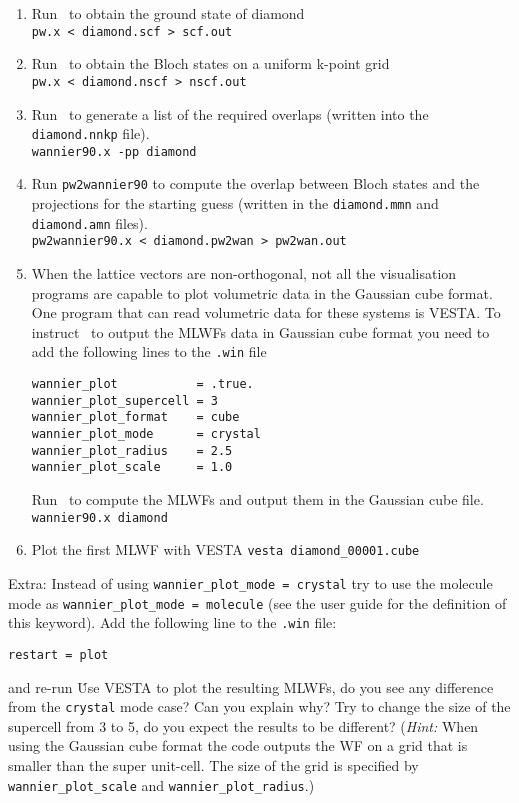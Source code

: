 \documentclass[a4paper,11pt,twoside]{article}
\begin{document}
\begin{enumerate}
\item Run \pwscf\ to obtain the ground state of diamond\\
{\tt pw.x < diamond.scf > scf.out}

\item Run \pwscf\ to obtain the Bloch states on a uniform k-point grid\\
{\tt pw.x < diamond.nscf > nscf.out}

\item Run \wannier\ to generate a list of the required overlaps (written
  into the {\tt diamond.nnkp} file).\\ 
{\tt wannier90.x -pp diamond}

\item Run {\tt pw2wannier90} to compute the overlap between Bloch
  states and the projections for the starting guess (written in the
  {\tt diamond.mmn} and {\tt diamond.amn} files).\\  
{\tt pw2wannier90.x < diamond.pw2wan > pw2wan.out}

\item When the lattice vectors are non-orthogonal, not all the visualisation programs are capable to plot volumetric data in the Gaussian cube format. 
One program that can read volumetric data for these systems is VESTA. 
To instruct \wannier\ to output the MLWFs data in Gaussian cube format you need to add the following lines to the {\tt .win} file
\begin{verbatim}
wannier_plot           = .true.
wannier_plot_supercell = 3
wannier_plot_format    = cube
wannier_plot_mode      = crystal
wannier_plot_radius    = 2.5
wannier_plot_scale     = 1.0
\end{verbatim}
Run \wannier\ to compute the MLWFs and output them in the Gaussian cube file.\\
{\tt wannier90.x diamond}

\item Plot the first MLWF with VESTA
  {\tt vesta diamond_00001.cube}
\end{enumerate}

Extra: Instead of using {\tt wannier_plot_mode = crystal} try to use the molecule mode as {\tt wannier_plot_mode = molecule} (see the user guide for the definition of this keyword).
Add the following line to the {\tt .win} file:
\begin{verbatim}
restart = plot
\end{verbatim}
and re-run \wannier\. Use VESTA to plot the resulting MLWFs, do you see any difference from the {\tt crystal} mode case? Can you explain why?
Try to change the size of the supercell from 3 to 5, do you expect the results to be different? ({\it Hint:} When using the Gaussian cube format the code outputs the WF on a grid that is smaller than the super
unit-cell. The size of the grid is specified by {\tt wannier_plot_scale} and {\tt wannier_plot_radius}.)





\end{document}
